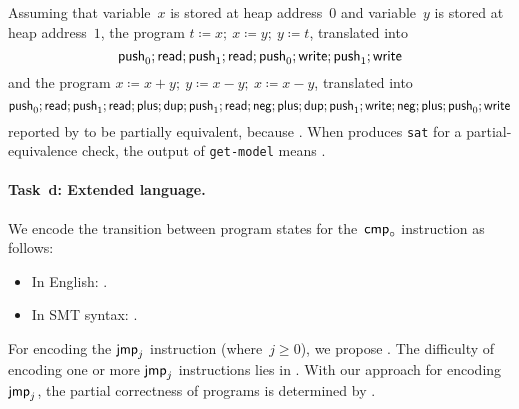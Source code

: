 Assuming that variable~$x$ is stored at heap address~$0$ and
variable~$y$ is stored at heap address~$1$, the program
$t \coloneqq x;~ x \coloneqq y;~ y \coloneqq t$, translated into
\[
  \mathsf{push}_{0}; \mathsf{read}; \mathsf{push}_{1}; \mathsf{read}; \mathsf{push}_{0}; \mathsf{write}; \mathsf{push}_{1}; \mathsf{write}
\]
and the program $x \coloneqq x+y;~ y \coloneqq x-y;~ x \coloneqq x-y$,
translated into
\[
  \mathsf{push}_{0}; \mathsf{read}; \mathsf{push}_{1}; \mathsf{read}; \mathsf{plus}; \mathsf{dup}; \mathsf{push}_{1}; \mathsf{read};
  \mathsf{neg}; \mathsf{plus}; \mathsf{dup}; \mathsf{push}_{1}; \mathsf{write}; \mathsf{neg}; \mathsf{plus}; \mathsf{push}_{0}; \mathsf{write}
\]
 reported by \SolverSMT to be partially
equivalent, because \todo{\filler}.
%
When \SolverSMT produces \texttt{sat} for a partial-equivalence check,
the output of \texttt{get-model} means \todo{\filler}.

\paragraph{Task~d: Extended language.}
We encode the transition between program states for the~$\mathsf{cmp}_{\circ}$
instruction as follows:
\begin{itemize}
\item In English: \todo{\filler}.
\item In SMT syntax: \todo{\filler}.
\end{itemize}
For encoding the $\mathsf{jmp}_{j}$ instruction (where~$j \geq 0$), we propose
\todo{\filler}.
%
The difficulty of encoding one or more $\mathsf{jmp}_{j}$ instructions lies in
\todo{\filler}.
%
With our approach for encoding $\mathsf{jmp}_{j}$, the partial correctness of
programs is determined by \todo{\filler}.

